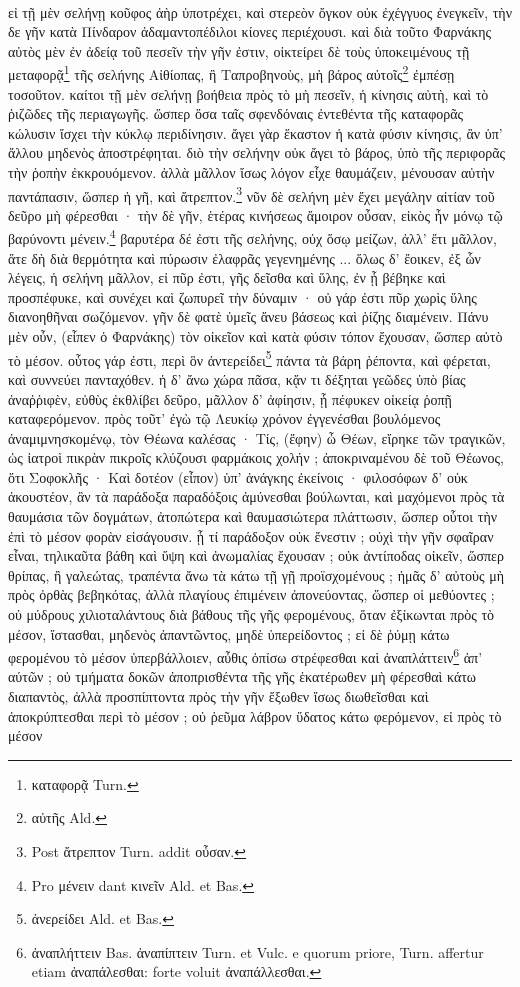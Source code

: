 \documentclass[a4paper, 11pt, oneside, polutonikogreek, german]{article}
\begin{document}
\paragraph{}
εἰ τῇ μὲν σελήνῃ κοῦφος ἀὴρ ὑποτρέχει, καὶ στερεὸν ὄγκον οὐκ ἐχέγγυος ἐνεγκεῖν, τὴν δε γῆν κατὰ Πίνδαρον ἀδαμαντοπέδιλοι κίονες περιέχουσι. καὶ διὰ τοῦτο Φαρνάκης αὐτὸς μὲν ἐν ἀδείᾳ τοῦ πεσεῖν τὴν γῆν ἐστιν, οἰκτείρει δὲ τοὺς ὑποκειμένους τῇ μεταφορᾷ\footnote{καταφορᾷ Turn.} τῆς σελήνης Αἰθίοπας, ἢ Ταπροβηνοὺς, μὴ βάρος αὐτοῖς\footnote{αὐτῆς Ald.} ἐμπέσῃ τοσοῦτον. καίτοι τῇ μὲν σελήνῃ βοήθεια πρὸς τὸ μὴ πεσεῖν, ἡ κίνησις αὐτὴ, καὶ τὸ ῥιζῶδες τῆς περιαγωγῆς. ὥσπερ ὅσα ταῖς σφενδόναις ἐντεθέντα τῆς καταφορᾶς κώλυσιν ἴσχει τὴν κύκλῳ περιδίνησιν. ἄγει γὰρ ἕκαστον ἡ κατὰ φύσιν κίνησις, ἂν ὑπ' ἄλλου μηδενὸς ἀποστρέφηται. διὸ τὴν σελήνην οὐκ ἄγει τὸ βάρος, ὑπὸ τῆς περιφορᾶς τὴν ῥοπὴν ἐκκρουόμενον. ἀλλὰ μᾶλλον ἴσως λόγον εἶχε θαυμάζειν, μένουσαν αὐτὴν παντάπασιν, ὥσπερ ἡ γῆ, καὶ ἄτρεπτον.\footnote{Post ἄτρεπτον Turn. addit οὖσαν.} νῦν δὲ σελήνη μὲν ἔχει μεγάλην αἰτίαν τοῦ δεῦρο μὴ φέρεσθαι · τὴν δὲ γῆν, ἑτέρας κινήσεως ἄμοιρον οὖσαν, εἰκὸς ἦν μόνῳ τῷ βαρύνοντι μένειν.\footnote{Pro μένειν dant κινεῖν Ald. et Bas.} βαρυτέρα δέ ἐστι τῆς σελήνης, οὐχ ὅσῳ μείζων, ἀλλ' ἔτι μᾶλλον, ἅτε δὴ διὰ θερμότητα καὶ πύρωσιν ἐλαφρᾶς γεγενημένης ... ὅλως δ' ἔοικεν, ἐξ ὧν λέγεις, ἡ σελήνη μᾶλλον, εἰ πῦρ ἐστι, γῆς δεῖσθα καὶ ὕλης, ἐν ᾗ βέβηκε καὶ προσπέφυκε, καὶ συνέχει καὶ ζωπυρεῖ τὴν δύναμιν · οὐ γάρ ἐστι πῦρ χωρὶς ὕλης διανοηθῆναι σωζόμενον. γῆν δὲ φατὲ ὑμεῖς ἄνευ βάσεως καὶ ῥίζης διαμένειν. Πάνυ μὲν οὖν, (εἶπεν ὁ Φαρνάκης) τὸν οἰκεῖον καὶ κατὰ φύσιν τόπον ἔχουσαν, ὥσπερ αὐτὸ τὸ μέσον. οὗτος γάρ ἐστι, περὶ ὃν ἀντερείδει\footnote{ἀνερείδει Ald. et Bas.} πάντα τὰ βάρη ῥέποντα, καὶ φέρεται, καὶ συννεύει πανταχόθεν. ἡ δ' ἄνω χώρα πᾶσα, κᾄν τι δέξηται γεῶδες ὑπὸ βίας ἀναῤῥιφὲν, εὐθὺς ἐκθλίβει δεῦρο, μᾶλλον δ' ἀφίησιν, ᾗ πέφυκεν οἰκείᾳ ῥοπῇ καταφερόμενον. πρὸς τοῦτ' ἐγὼ τῷ Λευκίῳ χρόνον ἐγγενέσθαι βουλόμενος ἀναμιμνησκομένῳ, τὸν Θέωνα καλέσας · Τίς, (ἔφην) ὦ Θέων, εἴρηκε τῶν τραγικῶν, ὡς ἰατροὶ πικρὰν πικροῖς κλύζουσι φαρμάκοις χολήν ; ἀποκριναμένου δὲ τοῦ Θέωνος, ὅτι Σοφοκλῆς · Καὶ δοτέον (εἶπον) ὑπ' ἀνάγκης ἐκείνοις · φιλοσόφων δ' οὐκ ἀκουστέον, ἂν τὰ παράδοξα παραδόξοις ἀμύνεσθαι βούλωνται, καὶ μαχόμενοι πρὸς τὰ θαυμάσια τῶν δογμάτων, ἀτοπώτερα καὶ θαυμασιώτερα πλάττωσιν, ὥσπερ οὗτοι τὴν ἐπὶ τὸ μέσον φορὰν εἰσάγουσιν. ᾗ τί παράδοξον οὐκ ἔνεστιν ; οὐχὶ τὴν γῆν σφαῖραν εἶναι, τηλικαῦτα βάθη καὶ ὕψη καὶ ἀνωμαλίας ἔχουσαν ; οὐκ ἀντίποδας οἰκεῖν, ὥσπερ θρίπας, ἢ γαλεώτας, τραπέντα ἄνω τὰ κάτω τῇ γῇ προϊσχομένους ; ἡμᾶς δ' αὐτοὺς μὴ πρὸς ὀρθὰς βεβηκότας, ἀλλὰ πλαγίους ἐπιμένειν ἀπονεύοντας, ὥσπερ οἱ μεθύοντες ; οὐ μύδρους χιλιοταλάντους διὰ βάθους τῆς γῆς φερομένους, ὅταν ἐξίκωνται πρὸς τὸ μέσον, ἵστασθαι, μηδενὸς ἀπαντῶντος, μηδὲ ὑπερείδοντος ; εἰ δὲ ῥύμῃ κάτω φερομένου τὸ μέσον ὑπερβάλλοιεν, αὖθις ὀπίσω στρέφεσθαι καὶ ἀναπλάττειν\footnote{ἀναπλήττειν Bas. ἀναπίπτειν Turn. et Vulc. e quorum priore, Turn. affertur etiam ἀναπάλεσθαι: forte voluit ἀναπάλλεσθαι.} ἀπ' αύτῶν ; οὐ τμήματα δοκῶν ἀποπρισθέντα τῆς γῆς ἑκατέρωθεν μὴ φέρεσθαὶ κάτω διαπαντὸς, ἀλλὰ προσπίπτοντα πρὸς τὴν γῆν ἔξωθεν ἴσως διωθεῖσθαι καὶ ἀποκρύπτεσθαι περὶ τὸ μέσον ; οὐ ῥεῦμα λάβρον ὕδατος κάτω φερόμενον, εἰ πρὸς τὸ μέσον 
\end{document}
